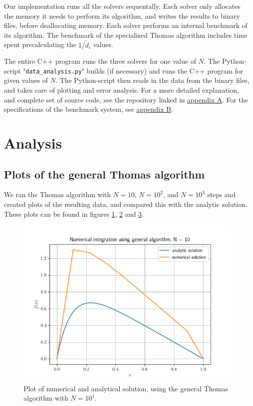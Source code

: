 \documentclass[english,notitlepage,reprint,nofootinbib]{revtex4-1}  %
\begin{document}
Our implementation runs all the solvers sequentally. Each solver only allocates the memory it needs to perform its algorithm, and writes the results to binary files, before deallocating memory. Each solver performs an internal benchmark of its algorithm. The benchmark of the specialized Thomas algorithm includes time spent precalculating the \(1/\tilde{d}_{i}\) values.

The entire C++ program  runs the three solvers for one value of \(N\). The Python-script "\verb+data_analysis.py+" builds (if necessary) and runs the C++ program for given values of \(N\). The Python-script then reads in the data from the binary files, and takes care of plotting and error analysis. For a more detailed explanation, and complete set of source code, see the repository linked in \hyperref[A]{appendix A}. For the specifications of the benchmark system, see \hyperref[B]{appendix B}.

\newpage

\section{Analysis} \label{sec:IV}
\subsection{Plots of the general Thomas algorithm} \label{subsec:IV:A}

We ran the Thomas algorithm with $N=10$, $N=10^2$, and $N=10^3$ steps and created plots of the resulting data, and compared this with the analytic solution. These plots can be found in figures \hyperref[fig:iv:a:1]{1}, \hyperref[fig:iv:a:2]{2} and \hyperref[fig:iv:a:3]{3}.


\begin{figure}[H]
	\centering
	\label{fig:iv:a:1}
	\includegraphics[width=\columnwidth]{plots/Figure_1.png}
	\caption{Plot of numerical and analytical solution, using the general Thomas algorithm with
	\(N=10^{1}\).}
\end{figure}
\end{document}
